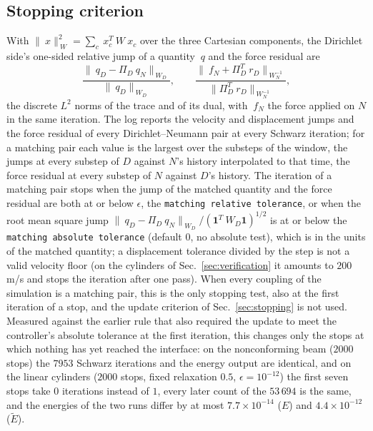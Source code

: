 \documentclass[11pt]{article}
\newcommand{\norm}[1]{\lVert #1 \rVert}
\newcommand{\code}[1]{\texttt{#1}}
\begin{document}
\subsection{Stopping criterion}
\label{sec:matching-stopping}

With $\norm{~x}^2_{~W} = \sum_c ~x_c^T ~W ~x_c$ over the three Cartesian
components, the Dirichlet side's one-sided relative jump of a quantity
$~q$ and the force residual are
\begin{equation}
  \frac{\norm{~q_D - \Pi_D ~q_N}_{~W_D}}{\norm{~q_D}_{~W_D}},
  \qquad
  \frac{\norm{~f_N + \Pi_D^T ~r_D}_{~W_N^{-1}}}{\norm{\Pi_D^T ~r_D}_{~W_N^{-1}}},
  \label{eq:stopping}
\end{equation}
the discrete $L^2$ norms of the trace and of its dual, with $~f_N$ the
force applied on $N$ in the same iteration. The log reports the velocity
and displacement jumps and the force residual of every Dirichlet--Neumann
pair at every Schwarz iteration; for a matching pair each value is the
largest over the substeps of the window, the jumps at every substep of
$D$ against $N$'s history interpolated to that time, the force residual at
every substep of $N$ against $D$'s history. The iteration of a matching
pair stops when the jump of the matched quantity and the force residual
are both at or below $\epsilon$, the \code{matching relative tolerance},
or when the root mean square jump
$\norm{~q_D - \Pi_D ~q_N}_{~W_D} / (\mathbf{1}^T ~W_D \mathbf{1})^{1/2}$
is at or below the \code{matching absolute tolerance} (default $0$, no
absolute test), which is in the units of the matched quantity; a
displacement tolerance divided by the step is not a valid velocity floor
(on the cylinders of Sec.~\ref{sec:verification} it amounts to $200$\,m/s
and stops the iteration after one pass). When every coupling of the
simulation is a matching pair, this is the only stopping test, also at the
first iteration of a stop, and the update criterion of
Sec.~\ref{sec:stopping} is not used. Measured against the earlier rule that
also required the update to meet the controller's absolute
tolerance at the first iteration, this changes only the stops at which
nothing has yet reached the interface: on the nonconforming beam
($2000$ stops) the $7953$ Schwarz iterations and the energy output are
identical, and on the linear cylinders ($2000$ stops, fixed relaxation
$0.5$, $\epsilon = 10^{-12}$) the first seven stops take $0$ iterations
instead of $1$, every later count of the $53\,694$ is the same, and the
energies of the two runs differ by at most $7.7\times 10^{-14}$ ($E$) and
$4.4\times 10^{-12}$ ($\tilde{E}$).
\end{document}
